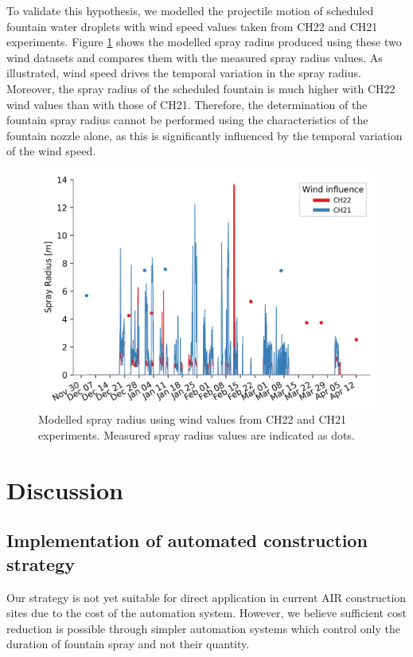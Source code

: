 \documentclass[tc, manuscript]{copernicus}
\begin{document}
To validate this hypothesis, we modelled the projectile motion of scheduled fountain water droplets with wind speed
values taken from CH22 and CH21 experiments. Figure \ref{fig:wind} shows the modelled spray radius
produced using these two wind datasets and compares them with the measured spray radius values. As illustrated,
wind speed drives the temporal variation in the spray radius. Moreover, the spray radius of the scheduled
fountain is much higher with CH22 wind values than with those of CH21. Therefore, the determination of
the fountain spray radius cannot be performed using the characteristics of the fountain nozzle alone, as this is
significantly influenced by the temporal variation of the wind speed.

\begin{figure}[htb]
\includegraphics[width=12 cm]{Figures/radf.png}
\caption{Modelled spray radius using wind values from CH22 and CH21 experiments. Measured spray radius values are
indicated as dots.}
\label{fig:wind}
\end{figure}

\section{Discussion}

\subsection{Implementation of automated construction strategy}

Our strategy is not yet suitable for direct application in current AIR construction sites due to
the cost of the automation system. However, we believe sufficient cost reduction is possible through simpler
automation systems which control only the duration of fountain spray and not their quantity.
\end{document}
